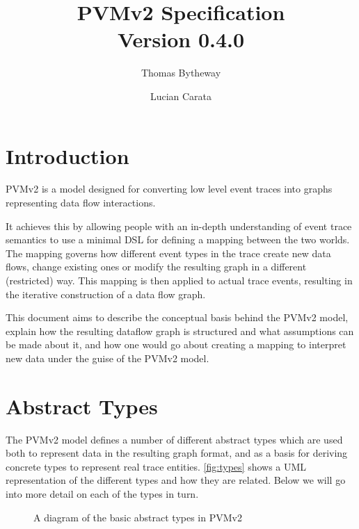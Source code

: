 \documentclass[12pt,twoside,a4paper]{article}
\begin{document}
\title{PVMv2 Specification\\\normalsize Version 0.4.0}
\author{Thomas Bytheway \and Lucian Carata}

\maketitle

\clearpage

\section{Introduction}
\label{sec:intro}
PVMv2 is a model designed for converting low level event traces into graphs representing data flow interactions. 

It achieves this by allowing people with an in-depth understanding of event trace semantics to use a minimal DSL for defining a mapping between the two worlds. 
The mapping governs how different event types in the trace create new data flows, change existing ones or modify the resulting graph in a different (restricted) way. 
This mapping is then applied to actual trace events, resulting in the iterative construction of a data flow graph.

This document aims to describe the conceptual basis behind the PVMv2 model, explain how the resulting dataflow graph is structured and what assumptions can be made about it, and how one would go about creating a mapping to interpret new data under the guise of the PVMv2 model.

\section{Abstract Types}
\label{sec:ty}
The PVMv2 model defines a number of different abstract types which are used both to represent data in the resulting graph format, and as a basis for deriving concrete types to represent real trace entities. 
\autoref{fig:types} shows a UML representation of the different types and how they are related. Below we will go into more detail on each of the types in turn.

\begin{figure}[h]
\centering

\caption{A diagram of the basic abstract types in PVMv2}
\label{fig:types}
\end{figure}
\end{document}
